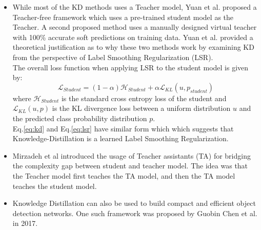 \documentclass{article} %
\begin{document}
\begin{itemize}
		\item While most of the KD methods uses a Teacher model, Yuan et al. \cite{teacherfree} proposed a Teacher-free framework which uses a pre-trained student model as the Teacher. A second proposed method uses a manually designed virtual teacher with 100\% accurate soft predictions on training data.
		Yuan et al. provided a theoretical justification as to why these two methods work by examining KD from the perspective of Label Smoothing Regularization (LSR).\\
		The overall loss function when applying LSR to the student model is given by:\\
		\begin{equation}\label{eq:lsr}
			\mathcal{L}_{Student}=(1-\alpha)\mathcal{H}_{Student}+\alpha\mathcal{L}_{KL}(u,p_{student})
		\end{equation}
		where $\mathcal{H}_{Student}$ is the standard cross entropy loss of the student and $\mathcal{L}_{KL}(u,p)$ is the KL divergence loss between a uniform distribution $u$ and the predicted class probability distribution $p$.\\
		Eq.\eqref{eq:kd} and Eq.\eqref{eq:lsr} have similar form which which suggests that Knowledge-Distillation is a learned Label Smoothing Regularization.
		
		\item 
		Mirzadeh et al \cite{assistant} introduced the usage of Teacher assistants (TA) for bridging the complexity gap between student and teacher model. The idea was that the Teacher model first teaches the TA model, and then the TA model teaches the student model.
		
		\item Knowledge Distillation can also be used to build compact and efficient object detection networks. One such framework was proposed by Guobin Chen et al. \cite{chen2017learning} in 2017. 
		
	\end{itemize}
	
\end{document}
